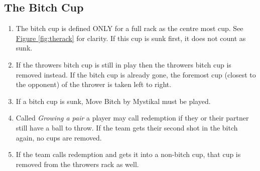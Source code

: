 	\subsection{The Bitch Cup}\label{ssec:BitchCup}
		\begin{enumerate}[label=(\roman*)]
            \item \label{sssec:BitchCup,def} The bitch cup is defined ONLY for a full rack as the centre most cup.
                See \hyperref[fig:therack]{Figure \ref{fig:therack}} for clarity. If this cup is sunk first, it does not count as sunk.
            \item \label{sssec:BitchCup,rem} If the throwers bitch cup is still in play then the throwers bitch cup is removed instead.
                If the bitch cup is already gone, the foremost cup (closest to the opponent) of the thrower is taken left to right.
            \item \label{sssec:BitchCup,song} If a bitch cup is sunk, Move Bitch by Mystikal must be played.
            \item \label{sssec:BitchCup,redemption} Called \emph{Growing a pair} a player may call redemption if they or their partner still have a ball to throw.
                If the team gets their second shot in the bitch again, no cups are removed.
            \item \label{sssec:BitchCup,redemptionFail} If the team calls redemption and gets it into a non-bitch cup, that cup is removed from the throwers rack as well.
        \end{enumerate}
